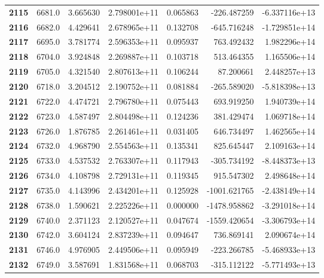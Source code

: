 \documentclass{report}[12pt]
\begin{document}
\begin{center}
\begin{tabular}{lrrrrrr}
\textbf{2115} &         6681.0 &   3.665630 &  2.798001e+11 &    0.065863 &  -226.487259 & -6.337116e+13 \\
\textbf{2116} &         6682.0 &   4.429641 &  2.678965e+11 &    0.132708 &  -645.716248 & -1.729851e+14 \\
\textbf{2117} &         6695.0 &   3.781774 &  2.596353e+11 &    0.095937 &   763.492432 &  1.982296e+14 \\
\textbf{2118} &         6704.0 &   3.924848 &  2.269887e+11 &    0.103718 &   513.464355 &  1.165506e+14 \\
\textbf{2119} &         6705.0 &   4.321540 &  2.807613e+11 &    0.106244 &    87.200661 &  2.448257e+13 \\
\textbf{2120} &         6718.0 &   3.204512 &  2.190752e+11 &    0.081884 &  -265.589020 & -5.818398e+13 \\
\textbf{2121} &         6722.0 &   4.474721 &  2.796780e+11 &    0.075443 &   693.919250 &  1.940739e+14 \\
\textbf{2122} &         6723.0 &   4.587497 &  2.804498e+11 &    0.124236 &   381.429474 &  1.069718e+14 \\
\textbf{2123} &         6726.0 &   1.876785 &  2.261461e+11 &    0.031405 &   646.734497 &  1.462565e+14 \\
\textbf{2124} &         6732.0 &   4.968790 &  2.554563e+11 &    0.135341 &   825.645447 &  2.109163e+14 \\
\textbf{2125} &         6733.0 &   4.537532 &  2.763307e+11 &    0.117943 &  -305.734192 & -8.448373e+13 \\
\textbf{2126} &         6734.0 &   4.108798 &  2.729131e+11 &    0.119345 &   915.547302 &  2.498648e+14 \\
\textbf{2127} &         6735.0 &   4.143996 &  2.434201e+11 &    0.125928 & -1001.621765 & -2.438149e+14 \\
\textbf{2128} &         6738.0 &   1.590621 &  2.225226e+11 &    0.000000 & -1478.958862 & -3.291018e+14 \\
\textbf{2129} &         6740.0 &   2.371123 &  2.120527e+11 &    0.047674 & -1559.420654 & -3.306793e+14 \\
\textbf{2130} &         6742.0 &   3.604124 &  2.837239e+11 &    0.094647 &   736.869141 &  2.090674e+14 \\
\textbf{2131} &         6746.0 &   4.976905 &  2.449506e+11 &    0.095949 &  -223.266785 & -5.468933e+13 \\
\textbf{2132} &         6749.0 &   3.587691 &  1.831568e+11 &    0.068703 &  -315.112122 & -5.771493e+13 \\

\end{tabular}
\end{center}
\end{document}
